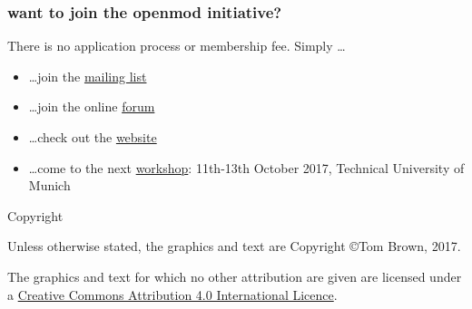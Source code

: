 \documentclass[12pt,aspectratio=169]{beamer}
\let\olditem\item
\renewcommand{\item}{%
\olditem\vspace{5pt}}
\begin{document}
\begin{frame}
  \frametitle{want to join the openmod initiative?}

  There is no application process or membership fee. Simply \dots
  \begin{itemize}
  \item \dots join the \alert{\href{https://groups.google.com/forum/\#!forum/openmod-initiative}{mailing list}}
  \item \dots join the online \alert{\href{https://forum.openmod-initiative.org/}{forum}}
  \item \dots check out the \alert{\href{http://openmod-initiative.org/}{website}}
  \item \dots come to the next \alert{\href{https://wiki.openmod-initiative.org/wiki/Open_Energy_Modelling_Workshop_-_Munich_2017}{workshop}}: 11th-13th October 2017,
    Technical University of Munich
  \end{itemize}

\end{frame}
\begin{frame}{Copyright}


  Unless otherwise stated, the graphics and text are Copyright \copyright Tom Brown, 2017.

  The graphics and text for which no other attribution are given are licensed under a
  \href{http://creativecommons.org/licenses/by/4.0/}{Creative Commons
  Attribution 4.0 International Licence}.

  \begin{center}\ccby\end{center}

\end{frame}
\end{document}
